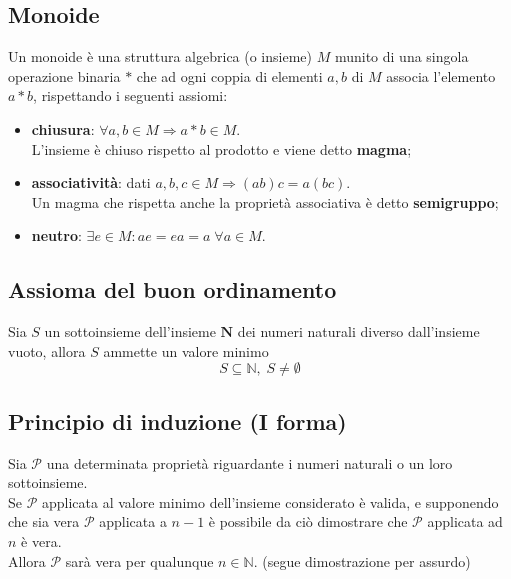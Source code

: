 \begin{flushleft}
\subsection{Monoide}
Un monoide è una struttura algebrica (o insieme) $M$ munito di una singola operazione binaria $\ast$ che ad ogni coppia di elementi $a, b$ di $M$ associa l'elemento $a\ast b$, rispettando i seguenti assiomi:
\begin{itemize}
    \item \textbf{chiusura}: $\forall a, b\in M\Rightarrow a\ast b \in M$.\\
    L'insieme è chiuso rispetto al prodotto e viene detto \textbf{magma};
    \item \textbf{associatività}: dati $a,b,c\in M\Rightarrow(ab)c = a(bc)$.\\
    Un magma che rispetta anche la proprietà associativa è detto \textbf{semigruppo};
    \item \textbf{neutro}: $\exists e \in M : ae = ea = a\;\forall a\in M$.
\end{itemize}


\subsection{Assioma del buon ordinamento}
Sia $S$ un sottoinsieme dell'insieme $\mathbf{N}$ dei numeri naturali diverso dall'insieme vuoto, allora $S$ ammette un valore minimo
\[S \subseteq \mathbb{N},\;S\neq \emptyset\]

\subsection{Principio di induzione (I forma)}
Sia $\mathcal{P}$ una determinata proprietà riguardante i numeri naturali o un loro sottoinsieme.\\
Se $\mathcal{P}$ applicata al valore minimo dell'insieme considerato è valida, e supponendo che sia vera $\mathcal{P}$ applicata a $n-1$ è possibile da ciò dimostrare che $\mathcal{P}$ applicata ad $n$ è vera.\\
Allora $\mathcal{P}$ sarà vera per qualunque $n\in \mathbb{N}$.
(segue dimostrazione per assurdo)
\\ \vspace{300px}



\end{flushleft}
